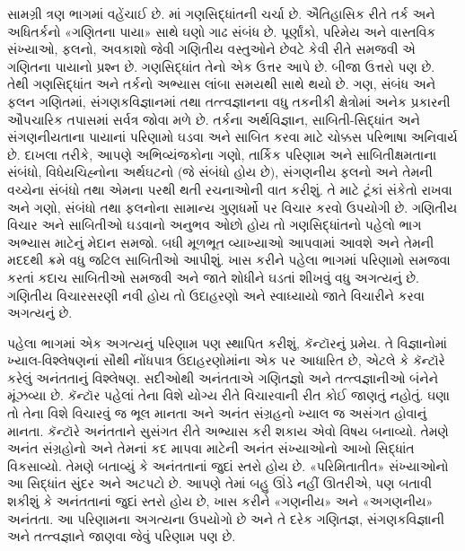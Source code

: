 સામગ્રી ત્રણ ભાગમાં વહેંચાઈ છે. માં ગણસિદ્ધાંતની
ચર્ચા છે. ઐતિહાસિક રીતે તર્ક અને અધિતર્કનો «ગણિતના પાયા» સાથે ઘણો
ગાઢ સંબંધ છે. પૂર્ણાંકો, પરિમેય અને વાસ્તવિક સંખ્યાઓ, ફલનો, અવકાશો
જેવી ગણિતીય વસ્તુઓને છેવટે કેવી રીતે સમજવી એ ગણિતના પાયાનો પ્રશ્ન
છે. ગણસિદ્ધાંત તેનો એક ઉત્તર આપે છે. બીજા ઉત્તરો પણ છે. તેથી
ગણસિદ્ધાંત અને તર્કનો અભ્યાસ લાંબા સમયથી સાથે થયો છે. ગણ, સંબંધ અને
ફલન ગણિતમાં, સંગણકવિજ્ઞાનમાં તથા તત્ત્વજ્ઞાનના વધુ તકનીકી ક્ષેત્રોમાં
અનેક પ્રકારની ઔપચારિક તપાસમાં સર્વત્ર જોવા મળે છે. તર્કના અર્થવિજ્ઞાન,
સાબિતી-સિદ્ધાંત અને સંગણનીયતાના પાયાનાં પરિણામો ઘડવા અને સાબિત કરવા
માટે ચોક્કસ પરિભાષા અનિવાર્ય છે. દાખલા તરીકે, આપણે અભિવ્યંજકોના ગણો,
તાર્કિક પરિણામ અને સાબિતીક્ષમતાના સંબંધો, વિધેયચિહ્નોના અર્થઘટનો
(જે સંબંધો હોય છે), સંગણનીય ફલનો અને તેમની વચ્ચેના સંબંધો તથા એમના
પરથી થતી રચનાઓની વાત કરીશું. તે માટે ટૂંકાં સંકેતો રાખવા અને ગણો,
સંબંધો તથા ફલનોના સામાન્ય ગુણધર્મો પર વિચાર કરવો ઉપયોગી છે. ગણિતીય
વિચાર અને સાબિતીઓ ઘડવાનો અનુભવ ઓછો હોય તો ગણસિદ્ધાંતનો પહેલો ભાગ
અભ્યાસ માટેનું મેદાન સમજો. બધી મૂળભૂત વ્યાખ્યાઓ આપવામાં આવશે અને
તેમની મદદથી ક્રમે વધુ જટિલ સાબિતીઓ આપીશું. ખાસ કરીને પહેલા ભાગમાં
પરિણામો સમજવા કરતાં કદાચ સાબિતીઓ સમજવી અને જાતે શોધીને ઘડતાં શીખવું
વધુ અગત્યનું છે. ગણિતીય વિચારસરણી નવી હોય તો ઉદાહરણો અને સ્વાધ્યાયો
જાતે વિચારીને કરવા અગત્યનું છે.

પહેલા ભાગમાં એક અગત્યનું પરિણામ પણ સ્થાપિત કરીશું, કૅન્ટૉરનું પ્રમેય.
તે વિજ્ઞાનોમાં ખ્યાલ-વિશ્લેષણનાં સૌથી નોંધપાત્ર ઉદાહરણોમાંના એક પર
આધારિત છે, એટલે કે કૅન્ટૉરે કરેલું અનંતતાનું વિશ્લેષણ. સદીઓથી અનંતતાએ
ગણિતજ્ઞો અને તત્ત્વજ્ઞાનીઓ બંનેને મૂંઝવ્યા છે. કૅન્ટૉર પહેલાં તેના વિશે
યોગ્ય રીતે વિચારવાની રીત કોઈ જાણતું નહોતું. ઘણા તો તેના વિશે વિચારવું
જ ભૂલ માનતા અને અનંત સંગ્રહનો ખ્યાલ જ અસંગત હોવાનું માનતા. કૅન્ટૉરે
અનંતતાને સુસંગત રીતે અભ્યાસ કરી શકાય એવો વિષય બનાવ્યો. તેમણે અનંત
સંગ્રહોનો અને તેમનાં કદ માપવા માટેની અનંત સંખ્યાઓનો આખો સિદ્ધાંત
વિકસાવ્યો. તેમણે બતાવ્યું કે અનંતતાનાં જુદાં સ્તરો હોય છે. «પરિમિતાતીત»
સંખ્યાઓનો આ સિદ્ધાંત સુંદર અને અટપટો છે. આપણે તેમાં બહુ ઊંડે નહીં
ઊતરીએ, પણ બતાવી શકીશું કે અનંતતાનાં જુદાં સ્તરો હોય છે, ખાસ કરીને
«ગણનીય» અને «અગણનીય» અનંતતા. આ પરિણામના અગત્યના ઉપયોગો છે અને તે
દરેક ગણિતજ્ઞ, સંગણકવિજ્ઞાની અને તત્ત્વજ્ઞાને જાણવા જેવું પરિણામ પણ છે.

